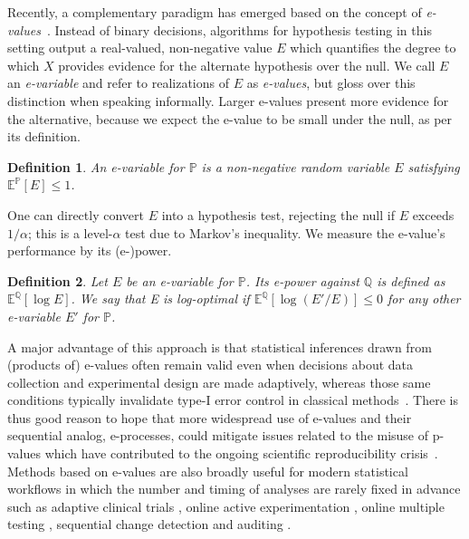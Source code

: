 \documentclass{article}
\newcommand{\Null}{\mathbb{P}}
\newcommand{\E}{\mathbb{E}}
\newcommand{\Alt}{\mathbb{Q}}
\newtheorem{definition}{Definition}[section]
\begin{document}
Recently, a complementary paradigm has emerged based on the concept of \emph{e-values}~\citep{ramdasHypothesisTestingEvalues}. 
Instead of binary decisions, algorithms for hypothesis testing in this setting output a real-valued, non-negative value $E$ which
quantifies the degree to which $X$ provides evidence for the alternate hypothesis over the null. 
We call $E$ an \emph{e-variable} and refer to realizations of $E$ as \emph{e-values}, but gloss over this distinction when speaking informally.
Larger e-values present more evidence for the alternative, because we expect the e-value to be small under the null, as per its definition.
\begin{definition}
    An \emph{e-variable for $\Null$} is a non-negative random variable $E$ satisfying $\E^\Null[E] \le 1$. 
\end{definition}
One can directly convert $E$ into a hypothesis test, rejecting the null if $E$ exceeds $1/\alpha$; this is a level-$\alpha$ test due to Markov's inequality. 
We measure the e-value's performance by its (e-)power.
\begin{definition}
    Let $E$ be an e-variable for $\Null$. Its \emph{e-power against $\Alt$} is defined as $\E^\Alt[\log E]$. We say that E is \emph{log-optimal} if $\E^\Alt[\log(E'/E)] \leq 0$ for any other e-variable $E'$ for $\Null$.
\end{definition}

A major advantage of this approach is that 
statistical inferences drawn from (products of) e-values often remain valid even when decisions about data collection and experimental design are made adaptively, whereas those same conditions typically invalidate type-I error control in classical methods~\citep{ramdasHypothesisTestingEvalues,grunwaldSafeTesting2020}. 
There is thus good reason to hope that more widespread use of e-values and their sequential analog, e-processes, could mitigate issues related to the misuse of p-values which have contributed to the ongoing scientific reproducibility crisis~\citep{ter_Schure_2019,amrhein2019scientists,shafer2021testing,grunwaldSafeTesting2020,ramdas2023game,chugg2026evaluesstatisticalevidencecomparison,huang2026controlling}. Methods based on e-values are also broadly useful for modern statistical workflows in which the number and timing of analyses are rarely fixed in advance such as adaptive clinical trials \cite{adaptive-clinical-trials}, online active experimentation \cite{waudby2024anytime-valid-contex-bandits, martinez-taboada2026vectorvalued}, online multiple testing \cite{online_multiple_testing_evalues}, sequential change detection \cite{edetectors} and auditing \cite{risk_auditing, fairness_auditing, privacy-auditing}. 
\end{document}
